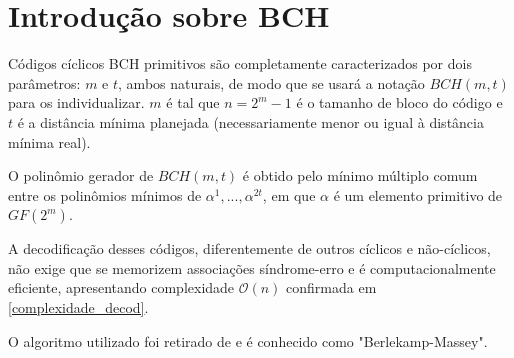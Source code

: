 \section{Introdução sobre BCH}

Códigos cíclicos BCH primitivos são completamente caracterizados por dois parâmetros: $m$ e $t$, ambos naturais, de modo que se usará a notação $BCH(m,t)$ para os individualizar. $m$ é tal que $n=2^m-1$ é o tamanho de bloco do código e $t$ é a distância mínima planejada (necessariamente menor ou igual à distância mínima real). 

O polinômio gerador de $BCH(m,t)$ é obtido pelo mínimo múltiplo comum entre os polinômios mínimos de $\alpha^1, ..., \alpha^{2t}$, em que $\alpha$ é um elemento primitivo de $GF(2^m)$.

A decodificação desses códigos, diferentemente de outros cíclicos e não-cíclicos, não exige que se memorizem associações síndrome-erro e é computacionalmente eficiente, apresentando complexidade $\mathcal{O}(n)$ confirmada em \ref{complexidade_decod}.

O algoritmo utilizado foi retirado de \cite{ref:algoritmo-berlekamp} e é conhecido como "Berlekamp-Massey".